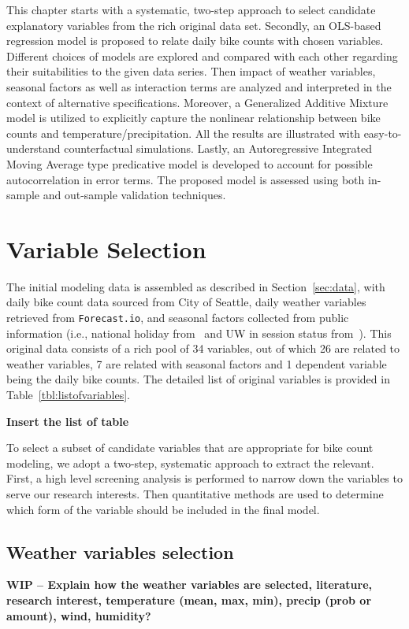 \documentclass [11pt, proquest] {uwthesis}[2015/03/03]
\begin{document}
This chapter starts with a systematic, two-step approach to select candidate explanatory variables from the rich original data set.  Secondly, an OLS-based regression model is proposed to relate daily bike counts with chosen variables. Different choices of models are explored and compared with each other regarding their suitabilities to the given data series. Then impact of weather variables, seasonal factors as well as interaction terms are analyzed and interpreted in the context of alternative specifications. Moreover, a Generalized  Additive Mixture model is utilized to explicitly capture the nonlinear relationship between bike counts and temperature/precipitation. All the results are illustrated with easy-to-understand counterfactual simulations. Lastly, an Autoregressive Integrated Moving Average type predicative model is developed to account for possible autocorrelation in error terms. The proposed model is assessed using both in-sample and out-sample validation techniques.

\section{Variable Selection}

The initial modeling data is assembled as described in Section~\ref{sec:data}, with daily bike count data sourced from City of Seattle, daily weather variables retrieved from \texttt{Forecast.io}, and seasonal factors collected from public information (i.e., national holiday from~\cite{} and UW in session status from~\cite{}). This original data consists of a rich pool of 34 variables, out of which 26 are related to weather variables, 7 are related with seasonal factors and 1 dependent variable being the daily bike counts. The detailed list of original variables is provided in Table~\ref{tbl:listofvariables}.

\textbf{Insert the list of table}

To select a subset of candidate variables that are appropriate for bike count modeling, we adopt a two-step, systematic approach to extract the relevant. First, a high level screening analysis is performed to narrow down the variables to serve our research interests. Then quantitative methods are used to determine which form of the variable should be included in the final model. 

\subsection{Weather variables selection}
\textbf{WIP -- Explain how the weather variables are selected, literature, research interest, temperature (mean, max, min), precip (prob or amount), wind, humidity?}
\end{document}
